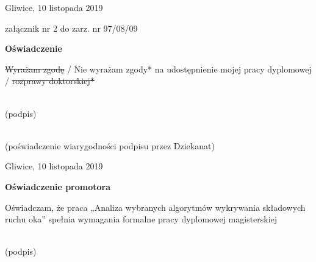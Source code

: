 Gliwice, 10 listopada 2019

\bigskip
\begin{flushright}
    załącznik nr 2 do zarz. nr 97/08/09\\[3\baselineskip]
\end{flushright}
\begin{center}
\begin{Large}
    \textbf{Oświadczenie}\\[3\baselineskip]
\end{Large}
\end{center}
\sout{Wyrażam zgodę} / Nie wyrażam zgody* na udostępnienie mojej pracy dyplomowej / \sout{rozprawy doktorskiej*}

\vspace{20mm}
\begin{flushright}
    \makebox[2.5in]{\dotfill}\\
    (podpis)
    \bigskip\bigskip\bigskip

    \makebox[2.5in]{\dotfill}\\
    {(poświadczenie wiarygodności
    podpisu przez Dziekanat)}
\end{flushright}%


\cleardoublepage

Gliwice, 10 listopada 2019

\vspace{20mm}
\begin{center}
\begin{Large}
    \textbf{Oświadczenie promotora}\\[3\baselineskip]
\end{Large}
\end{center}
Oświadczam, że praca „Analiza wybranych algorytmów wykrywania składowych ruchu oka” spełnia wymagania formalne pracy dyplomowej magisterskiej

\bigskip
\bigskip
\begin{flushright}
    \makebox[2.5in]{\dotfill}\\
    (podpis)
\end{flushright}%


\cleardoublepage
